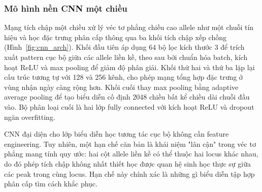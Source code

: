 \documentclass[12pt,a4paper]{article}
\begin{document}
\subsubsection{Mô hình nền CNN một chiều}

Mạng tích chập một chiều xử lý véc tơ phẳng chiều cao allele như một chuỗi tín hiệu và học đặc trưng phân cấp thông qua ba khối tích chập xếp chồng (Hình~\ref{fig:cnn_arch}). Khối đầu tiên áp dụng 64 bộ lọc kích thước 3 để trích xuất pattern cục bộ giữa các allele liền kề, theo sau bởi chuẩn hóa batch, kích hoạt ReLU và max pooling để giảm độ phân giải. Khối thứ hai và thứ ba lặp lại cấu trúc tương tự với 128 và 256 kênh, cho phép mạng tổng hợp đặc trưng ở vùng nhận ngày càng rộng hơn. Khối cuối thay max pooling bằng adaptive average pooling để tạo biểu diễn cố định 2048 chiều bất kể chiều dài chuỗi đầu vào. Bộ phân loại cuối là hai lớp fully connected với kích hoạt ReLU và dropout ngăn overfitting.

CNN đại diện cho lớp biểu diễn học tương tác cục bộ không cần feature engineering. Tuy nhiên, một hạn chế căn bản là khái niệm "lân cận" trong véc tơ phẳng mang tính quy ước: hai cột allele liền kề có thể thuộc hai locus khác nhau, do đó phép tích chập không nhất thiết học được quan hệ sinh học thực sự giữa các peak trong cùng locus. Hạn chế này chính xác là những gì biểu diễn tập hợp phân cấp tìm cách khắc phục.
\end{document}
